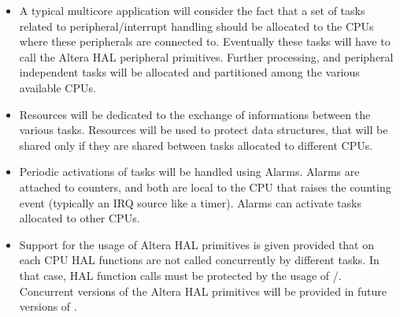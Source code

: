 \begin{itemize}
\item A typical multicore application will consider the fact that a
  set of tasks related to peripheral/interrupt handling should be
  allocated to the CPUs where these peripherals are connected to.
  Eventually these tasks will have to call the Altera HAL peripheral
  primitives. Further processing, and peripheral independent tasks
  will be allocated and partitioned among the various available CPUs.


\item Resources will be dedicated to the exchange of informations
  between the various tasks. Resources will be used to protect data
  structures, that will be shared only if they are shared between
  tasks allocated to different CPUs.


\item Periodic activations of tasks will be handled using
  Alarms. Alarms are attached to counters, and both are local to the
  CPU that raises the counting event (typically an IRQ source like a
  timer). Alarms can activate tasks allocated to other CPUs.


\item Support for the usage of Altera HAL primitives is given provided
  that on each CPU HAL functions are not called concurrently by
  different tasks. In that case, HAL function calls must be protected
  by the usage of
  /. Concurrent versions of
  the Altera HAL primitives will be provided in future versions of
  \ee.

\end{itemize}

